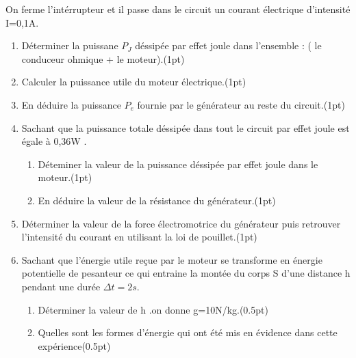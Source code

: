 \documentclass[12pt]{article}
\begin{document}
On ferme l’intérrupteur et il passe dans le circuit un courant électrique d’intensité I=0,1A.
 \begin{enumerate} 
   \item  Déterminer la puissane $P_J$ déssipée par effet joule dans l’ensemble : ( le conduceur ohmique + le moteur).\dotfill(1pt)

    \item  Calculer la puissance utile du moteur électrique.\dotfill(1pt)

    \item  En déduire la puissance $P_e$ fournie par le générateur au reste du circuit.\dotfill(1pt)

    \item  Sachant que la puissance totale déssipée dans tout le circuit par effet joule est égale à  0,36W .
      \begin{enumerate}
        \item  Déteminer la valeur de la puissance déssipée par effet joule dans le moteur.\dotfill(1pt)

        \item  En déduire la valeur de la résistance du générateur.\dotfill(1pt)
          \end{enumerate}
\item Déterminer la valeur de la force électromotrice du générateur puis retrouver l’intensité du courant en utilisant la loi de
  pouillet.\dotfill(1pt)
     \item  Sachant que l’énergie utile reçue par le moteur se transforme en énergie potentielle de pesanteur ce qui entraine la montée du corps S d’une distance h pendant une durée $\Delta{t} = 2s$.
       \begin{enumerate}
         \item Déterminer la valeur de h .on donne g=10N/kg.\dotfill(0.5pt)
         \item Quelles sont les formes d’énergie qui ont été mis en évidence dans cette expérience\dotfill(0.5pt)
       \end{enumerate}
 \end{enumerate}
\end{document}
